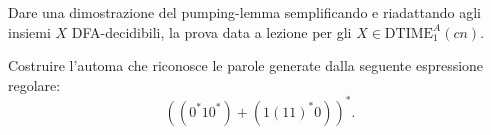 


\begin{ex}
Dare una dimostrazione del pumping-lemma semplificando e riadattando agli insiemi $X$ DFA-decidibili, la prova data a lezione per gli $X\in\mathrm{DTIME}_1^A(cn)$.
\end{ex}

\newpage

\begin{ex}
Costruire l'automa che riconosce le parole generate dalla seguente espressione regolare:
\[
((0^*10^*)+(1(11)^*0))^*.
\]
\end{ex}

